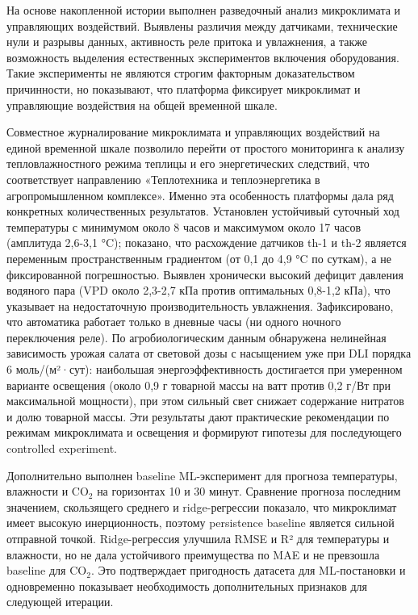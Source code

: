 \documentclass[a4paper,14pt]{extarticle}
\renewcommand{\texttt}[1]{\textnormal{#1}}
\begin{document}
На основе накопленной истории выполнен разведочный анализ микроклимата и
управляющих воздействий. Выявлены различия между датчиками, технические
нули и разрывы данных, активность реле притока и увлажнения, а также
возможность выделения естественных экспериментов включения оборудования.
Такие эксперименты не являются строгим факторным доказательством
причинности, но показывают, что платформа фиксирует микроклимат и
управляющие воздействия на общей временной шкале.

Совместное журналирование микроклимата и управляющих воздействий на
единой временной шкале позволило перейти от простого мониторинга к
анализу тепловлажностного режима теплицы и его энергетических следствий,
что соответствует направлению «Теплотехника и теплоэнергетика в
агропромышленном комплексе». Именно эта особенность платформы дала ряд
конкретных количественных результатов. Установлен устойчивый суточный
ход температуры с минимумом около 8 часов и максимумом около 17 часов
(амплитуда 2,6-3,1 °C); показано, что расхождение датчиков \texttt{th-1}
и \texttt{th-2} является переменным пространственным градиентом (от 0,1
до 4,9 °C по суткам), а не фиксированной погрешностью. Выявлен
хронически высокий дефицит давления водяного пара (VPD около 2,3-2,7 кПа
против оптимальных 0,8-1,2 кПа), что указывает на недостаточную
производительность увлажнения. Зафиксировано, что автоматика работает
только в дневные часы (ни одного ночного переключения реле). По
агробиологическим данным обнаружена нелинейная зависимость урожая салата
от световой дозы с насыщением уже при DLI порядка 6 моль/(м²·сут):
наибольшая энергоэффективность достигается при умеренном варианте
освещения (около 0,9 г товарной массы на ватт против 0,2 г/Вт при
максимальной мощности), при этом сильный свет снижает содержание
нитратов и долю товарной массы. Эти результаты дают практические
рекомендации по режимам микроклимата и освещения и формируют гипотезы
для последующего controlled experiment.

Дополнительно выполнен baseline ML-эксперимент для прогноза температуры,
влажности и CO\(_2\) на горизонтах 10 и 30 минут. Сравнение прогноза
последним значением, скользящего среднего и ridge-регрессии показало,
что микроклимат имеет высокую инерционность, поэтому persistence
baseline является сильной отправной точкой. Ridge-регрессия улучшила
RMSE и R² для температуры и влажности, но не дала устойчивого
преимущества по MAE и не превзошла baseline для CO\(_2\). Это
подтверждает пригодность датасета для ML-постановки и одновременно
показывает необходимость дополнительных признаков для следующей
итерации.
\end{document}
